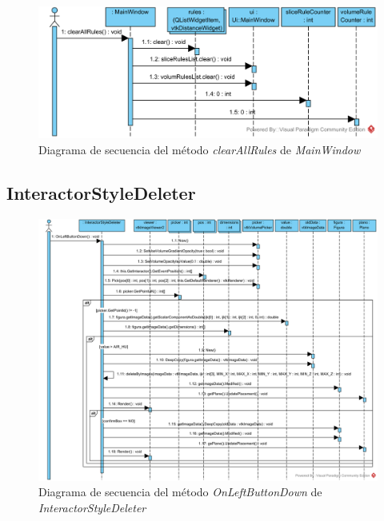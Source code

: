 \begin{figure}[H]
	\centering
	\includegraphics[width=12cm]{imagenes/diagramas/secuencia/MainWindow_ClearAllRules}
	\caption{Diagrama de secuencia del método \textit{clearAllRules} de \textit{MainWindow}}
	\label{fig:diagrama_secuencia_mainwindow_clearallrules}
\end{figure}

\subsection{InteractorStyleDeleter}

\begin{figure}[H]
	\centering
	\includegraphics[angle=90,width=12cm]{imagenes/diagramas/secuencia/InteractorStyleDeleter_OnLeftButtonDown}
	\caption{Diagrama de secuencia del método \textit{OnLeftButtonDown} de \textit{InteractorStyleDeleter}}
	\label{fig:diagrama_secuencia_interactorstyledeleter_onfeftbuttondown}
\end{figure}

